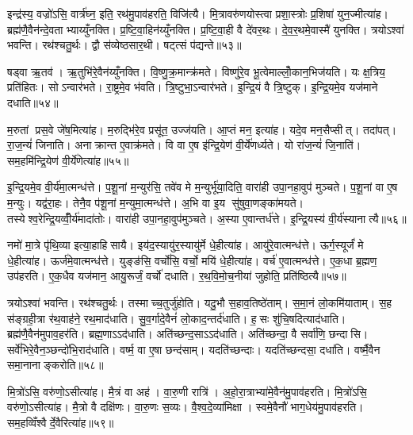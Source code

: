 इन्द्र॑स्य॒ वज्रो॑ऽसि॒ वार्त्र॑घ्न॒ इति॒ रथ॑मु॒पाव॑हरति॒ विजि॑त्यै। मि॒त्रावरु॑णयोस्त्वा प्रशा॒स्त्रोः प्र॒शिषा॑ युन॒ज्मीत्या॑ह। ब्रह्म॑णै॒वैन॑न्दे॒वताभ्याय्युँनक्ति। प्र॒ष्टि॒वा॒हिन॑य्युँनक्ति। प्र॒ष्टि॒वा॒ही वै दे॑वर॒थः। दे॒व॒र॒थमे॒वास्मै॑ युनक्ति। त्रयोऽश्वा॑ भवन्ति। रथ॑श्चतु॒र्थः। द्वौ स॑व्येष्ठसार॒थी। षट्त्सं प॑द्यन्ते॥५३॥

षड्वा ऋ॒तव॑। ऋ॒तुभि॑रे॒वैन॑य्युँनक्ति। वि॒ष्णु॒क्र॒मान्क्र॑मते। विष्णु॑रे॒व भू॒त्वेमाल्लोँ॒कान॒भिज॑यति। यः क्ष॒त्रिय॒ प्रति॑हितः। सोऽन्वार॑भते। रा॒ष्ट्रमे॒व भ॑वति। त्रि॒ष्टुभा॒ऽन्वार॑भते। इ॒न्द्रि॒यं वै त्रि॒ष्टुक्। इ॒न्द्रि॒यमे॒व यज॑माने दधाति॥५४॥

म॒रुतां प्रस॒वे जे॑ष॒मित्या॑ह। म॒रुद्भि॑रे॒व प्रसू॑त॒ उज्ज॑यति। आ॒प्तं मन॒ इत्या॑ह। यदे॒व मन॒सैप्सीत्। तदा॑पत्। रा॒ज॒न्यं॑ जिनाति। अनाक्रान्त ए॒वाक्र॑मते। वि वा ए॒ष इ॑न्द्रि॒येण॑ वी॒र्ये॑णर्ध्यते। यो रा॑ज॒न्यं॑ जि॒नाति॑। सम॒हमि॑न्द्रि॒येण॑ वी॒र्ये॑णेत्या॑ह॥५५॥

इ॒न्द्रि॒यमे॒व वी॒र्य॑मा॒त्मन्ध॑त्ते। प॒शू॒नां म॒न्युर॑सि॒ तवे॑व मे म॒न्युर्भू॑या॒दिति॒ वारा॑ही उपा॒नहा॒वुप॑ मुञ्चते। प॒शू॒नां वा ए॒ष म॒न्युः। यद्व॑रा॒हः। तेनै॒व प॑शू॒नां म॒न्युमा॒त्मन्ध॑त्ते। अ॒भि वा इ॒य सु॑षुवा॒णङ्का॑मयते। तस्येश्व॒रेन्द्रि॒यव्वीँ॒र्य॑मादा॑तोः। वारा॑ही उपा॒नहा॒वुप॑मुञ्चते। अ॒स्या ए॒वान्तर्ध॑त्ते। इ॒न्द्रि॒यस्य॑ वी॒र्य॑स्यानात्यै॥५६॥

नमो॑ मा॒त्रे पृ॑थि॒व्या इत्या॒हाहिसायै। इय॑द॒स्यायु॑र॒स्यायु॑र्मे धे॒हीत्या॑ह। आयु॑रे॒वात्मन्ध॑त्ते। ऊर्ग॒स्यूर्जं॑ मे धे॒हीत्या॑ह। ऊर्ज॑मे॒वात्मन्ध॑त्ते। युङ्ङ॑सि॒ वर्चो॑सि॒ वर्चो॒ मयि॑ धे॒हीत्या॑ह। वर्च॑ ए॒वात्मन्ध॑त्ते। ए॒क॒धा ब्र॒ह्मण॒ उप॑हरति। ए॒क॒धैव यज॑मान॒ आयु॒रूर्जं॒ वर्चो॑ दधाति। र॒थ॒वि॒मो॒च॒नीया॑ जुहोति॒ प्रति॑ष्ठित्यै॥५७॥

त्रयोऽश्वा॑ भवन्ति। रथ॑श्चतु॒र्थः। तस्माच्च॒तुर्जु॑होति। यदु॒भौ स॒हाव॒तिष्ठे॑ताम्। स॒मा॒नं लो॒कमि॑याताम्। स॒ह स॑ङ्ग्रही॒त्रा र॑थ॒वाह॑ने॒ रथ॒माद॑धाति। सु॒व॒र्गादे॒वैनं॑ लो॒काद॒न्तर्द॑धाति। ह॒सः शु॑चि॒षदित्याद॑धाति। ब्रह्म॑णै॒वैन॑मुपाव॒हर॑ति। ब्रह्म॒णाऽऽद॑धाति। अति॑च्छन्द॒साऽऽद॑धाति। अति॑च्छन्दा॒ वै सर्वा॑णि॒ छन्दासि। सर्वे॑भिरे॒वैन॒ञ्छन्दो॑भि॒राद॑धाति। वर्ष्म॒ वा ए॒षा छन्द॑साम्। यदति॑च्छन्दाः। यदति॑च्छन्दसा॒ दधा॑ति। वर्ष्मै॒वैन समा॒नानाङ्करोति॥५८॥\anuvakamend[प॒द्य॒न्ते॒ द॒धा॒ति॒ वी॒र्ये॑णेत्या॒हानात्यै॒ प्रति॑ष्ठित्यै॒ ब्रह्म॒णाऽऽद॑धाति स॒प्त च॑]

मि॒त्रो॑ऽसि॒ वरु॑णो॒ऽसीत्या॑ह। मै॒त्रं वा अह॑। वा॒रु॒णी रात्रि॑। अ॒हो॒रा॒त्राभ्या॑मे॒वैन॑मु॒पाव॑हरति। मि॒त्रो॑ऽसि॒ वरु॑णो॒ऽसीत्या॑ह। मै॒त्रो वै दक्षि॑णः। वा॒रु॒णः स॒व्यः। वै॒श्व॒दे॒व्या॑मिक्षा। स्वमे॒वैनौ॑ भाग॒धेय॑मु॒पाव॑हरति। सम॒हव्विँश्वैर्दे॒वैरित्या॑ह॥५९॥

